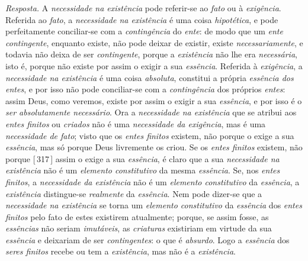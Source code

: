 \documentclass[12pt,a4paper]{article}
\newcommand{\pg}[1]{\thinspace\textup{[\,#1\,]}\thinspace}
\begin{document}
{  \emph{Resposta.} A \emph{necessidade na existência} pode referir-se ao
  \emph{fato} ou à \emph{exigência}. \textemdash{} Referida ao \emph{fato}, a
  \emph{necessidade na existência} é uma coisa \emph{hipotética}, e pode
  perfeitamente conciliar-se com a \emph{contingência} do \emph{ente}: de modo
  que um \emph{ente contingente}, enquanto existe, não pode deixar de existir,
  existe \emph{necessariamente}, e todavia não deixa de ser \emph{contingente},
  porque a \emph{existência} não lhe era \emph{necessária}, isto é, porque não
  existe por assim o exigir a sua \emph{essência}. \textemdash{} Referida à
  \emph{exigência}, a \emph{necessidade na existência} é uma coisa
  \emph{absoluta}, constitui a própria \emph{essência dos entes}, e por isso não
  pode conciliar-se com a \emph{contingência} dos próprios \emph{entes}: assim
  Deus, como veremos, existe por assim o exigir a sua \emph{essência}, e por
  isso é o \emph{ser absolutamente necessário}. \textemdash{} Ora a
  \emph{necessidade na existência} que se atribui aos \emph{entes finitos} ou
  \emph{criados} não é uma \emph{necessidade da exigência}, mas é uma
  \emph{necessidade de fato}; visto que os \emph{entes finitos} existem, não
  porque o exige a sua \emph{essência}, mas só porque Deus livremente os criou.
  Se os \emph{entes finitos} existem, não porque \pg{317} assim o exige a sua
  \emph{essência}, é claro que a sua \emph{necessidade na existência} não é um
  \emph{elemento constitutivo} da mesma \emph{essência}. Se, nos \emph{entes
  finitos}, a \emph{necessidade da existência} não é um \emph{elemento
  constitutivo} da \emph{essência}, a \emph{existência} distingue-se
  \emph{realmente} da \emph{essência}. \textemdash{} Nem pode dizer-se que a
  \emph{necessidade na existência} se torna um \emph{elemento constitutivo} da
  \emph{essência} dos \emph{entes finitos} pelo fato de estes existirem
  atualmente; porque, se assim fosse, as \emph{essências} não seriam
  \emph{imutáveis}, as \emph{criaturas} existiriam em virtude da sua
  \emph{essência} e deixariam de ser \emph{contingentes}: o que é
  \emph{absurdo}. Logo a \emph{essência} dos \emph{seres finitos} recebe ou tem
  a \emph{existência}, mas não é a \emph{existência}.}
\end{document}
